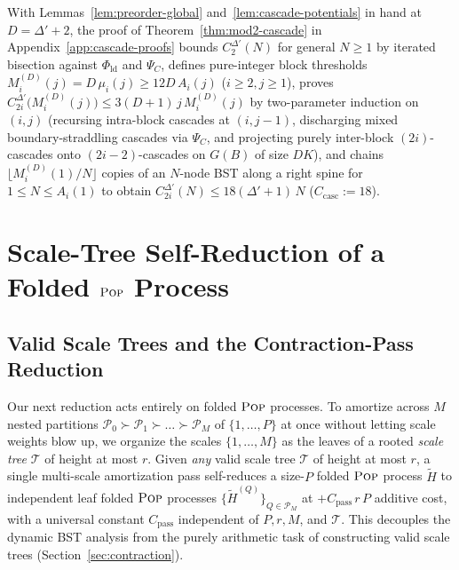\documentclass[11pt]{article}
\theoremstyle{definition}
\theoremstyle{remark}
\newcommand{\ld}{\mathrm{ld}}
\newcommand{\POP}{\textnormal{\scshape Pop}}
\begin{document}
With Lemmas~\ref{lem:preorder-global} and~\ref{lem:cascade-potentials} in hand at $D = \Delta' + 2$, the proof of Theorem~\ref{thm:mod2-cascade} in Appendix~\ref{app:cascade-proofs} bounds $C^{\Delta'}_2(N)$ for general $N \ge 1$ by iterated bisection against $\Phi_{\ld}$ and $\Psi_C$, defines pure-integer block thresholds $M^{(D)}_i(j) = D\,\mu_i(j) \ge 12 D\,A_i(j)$ ($i \ge 2, j \ge 1$), proves $C^{\Delta'}_{2i}\big(M^{(D)}_i(j)\big) \le 3(D + 1)\,j\,M^{(D)}_i(j)$ by two-parameter induction on $(i, j)$ (recursing intra-block cascades at $(i, j - 1)$, discharging mixed boundary-straddling cascades via $\Psi_C$, and projecting purely inter-block $(2i)$-cascades onto $(2i - 2)$-cascades on $G(B)$ of size $D K$), and chains $\lfloor M^{(D)}_i(1) / N \rfloor$ copies of an $N$-node BST along a right spine for $1 \le N \le A_i(1)$ to obtain $C^{\Delta'}_{2i}(N) \le 18(\Delta' + 1)\,N$ ($C_{\mathrm{casc}} := 18$).


\section{Scale-Tree Self-Reduction of a Folded \texorpdfstring{$\POP$}{Pop} Process}
\label{sec:scale-tree}

\subsection{Valid Scale Trees and the Contraction-Pass Reduction}
\label{subsec:overview-mod3}

Our next reduction acts entirely on folded $\POP$ processes. To amortize across $M$ nested partitions $\mathcal{P}_0 \succ \mathcal{P}_1 \succ \dots \succ \mathcal{P}_M$ of $\{1, \dots, P\}$ at once without letting scale weights blow up, we organize the scales $\{1, \dots, M\}$ as the leaves of a rooted \emph{scale tree} $\mathcal{T}$ of height at most $r$. Given \emph{any} valid scale tree $\mathcal{T}$ of height at most $r$, a single multi-scale amortization pass self-reduces a size-$P$ folded $\POP$ process $\widetilde{H}$ to independent leaf folded $\POP$ processes $\{\widetilde{H}^{(Q)}\}_{Q \in \mathcal{P}_M}$ at $+C_{\mathrm{pass}}\,r\,P$ additive cost, with a universal constant $C_{\mathrm{pass}}$ independent of $P, r, M$, and $\mathcal{T}$. This decouples the dynamic BST analysis from the purely arithmetic task of constructing valid scale trees (Section~\ref{sec:contraction}).
\end{document}
